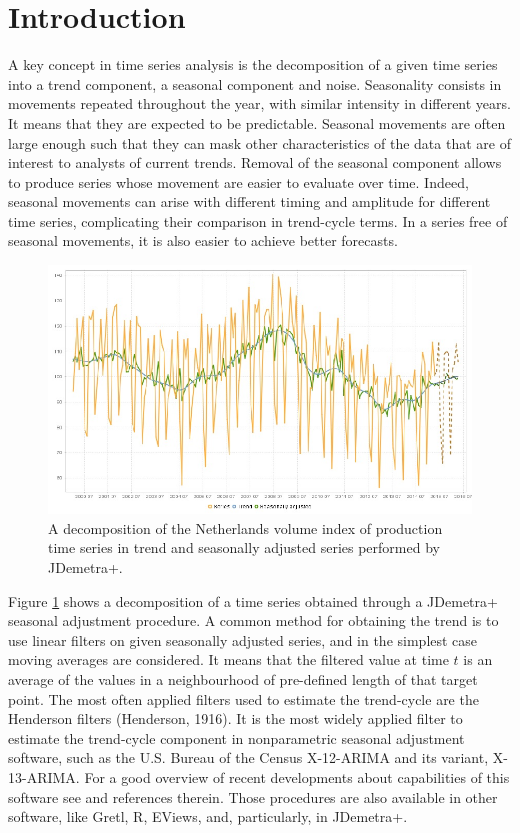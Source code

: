 \documentclass[english,blauw]{cbsdiscussionpaper}
\begin{document}
\section{Introduction}
A key concept in time series analysis is the decomposition of a given time series into a trend component, a seasonal component and noise. Seasonality consists in movements repeated throughout the year, with similar intensity in different years. It means that they are expected to be predictable. Seasonal movements are often large enough such that they can mask other characteristics of the data that are of interest to analysts of current trends. Removal of the seasonal component allows to produce series whose movement are easier to evaluate over time. Indeed, seasonal movements can arise with different timing and amplitude for different time series, complicating their comparison in trend-cycle terms. In a series free of seasonal movements, it is also easier to achieve better forecasts.
\begin{figure}[h]
\includegraphics[width=\linewidth]{../images/capitolo1/intro.jpg}
\caption{A decomposition of the Netherlands volume index of production time series in trend and seasonally adjusted series performed by JDemetra+.}
\label{fig:intro}
\end{figure}
Figure \ref{fig:intro} shows a decomposition of a time series obtained through a JDemetra+ seasonal adjustment procedure. A common method for obtaining the trend is to use linear filters on given seasonally adjusted series, and in the simplest case moving averages are considered. It means that the filtered value at time $t$ is an average of the values in a neighbourhood of pre-defined length of that target point. The most often applied filters used to estimate the trend-cycle are the Henderson filters (Henderson, 1916). It is the most widely applied filter to estimate the trend-cycle component in nonparametric seasonal adjustment software, such as the U.S. Bureau of the Census X-12-ARIMA and its variant, X-13-ARIMA. For a good overview of recent developments about capabilities of this software see \citep{fin2005} and references therein. Those procedures are also available in other software, like Gretl, R, EViews, and, particularly, in JDemetra+.\\
\end{document}
